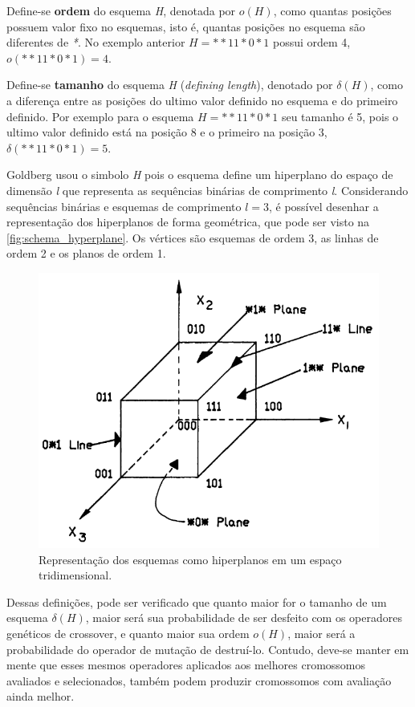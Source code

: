 Define-se \textbf{ordem} do esquema \textit{H}, denotada por \(o(H)\), como quantas posições possuem valor fixo no esquemas, isto é, quantas posições no esquema são diferentes de \textit{*}. No exemplo anterior \(H=**11*0*1\) possui ordem 4, \(o(**11*0*1) = 4\).

Define-se \textbf{tamanho} do esquema \textit{H} (\textit{defining length}), denotado por \(\delta(H)\), como a diferença entre as posições do ultimo valor definido no esquema e do primeiro definido. Por exemplo para o esquema \(H=**11*0*1\) seu tamanho é 5, pois o ultimo valor definido está na posição 8 e o primeiro na posição 3, \(\delta(**11*0*1) = 5\). 

Goldberg usou o simbolo \textit{H} pois o esquema define um hiperplano do espaço de dimensão \textit{l} que representa as sequências binárias de comprimento \textit{l}. Considerando sequências binárias e esquemas de comprimento \(l=3\), é possível desenhar a representação dos hiperplanos de forma geométrica, que pode ser visto na \autoref{fig:schema_hyperplane}. Os vértices são esquemas de ordem 3, as linhas de ordem 2 e os planos de ordem 1.

\begin{figure}[h!]
	\centering
	\includegraphics[width=0.75\linewidth]{imagens/schema_hyperplane.png}
	\caption{Representação dos esquemas como hiperplanos em um espaço tridimensional. \cite{Goldberg1989}}
	\label{fig:schema_hyperplane}
\end{figure}

Dessas definições, pode ser verificado que quanto maior for o tamanho de um esquema \(\delta(H)\), maior será sua probabilidade de ser desfeito com os operadores genéticos de crossover, e quanto maior sua ordem \(o(H)\), maior será a probabilidade do operador de mutação de destruí-lo. Contudo, deve-se manter em mente que esses mesmos operadores aplicados aos melhores cromossomos avaliados e selecionados, também podem produzir cromossomos com avaliação ainda melhor.


